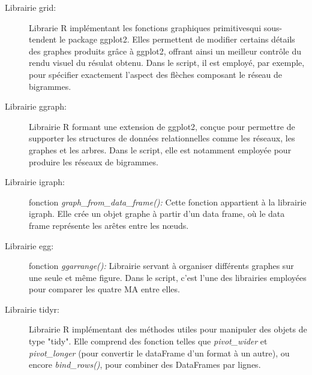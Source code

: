 \documentclass{book}
\begin{document}
\begin{description}
      \item[Librairie grid:] Librarie R implémentant les fonctions graphiques primitives\sloppy qui sous-tendent le package ggplot2. Elles permettent de modifier certains détails des graphes produits grâce à ggplot2, offrant ainsi un meilleur contrôle du rendu visuel du résulat obtenu. Dans le script, il est employé, par exemple, pour spécifier exactement l'aspect des flèches composant le réseau de bigrammes. 
      \item[Librairie ggraph:] Librairie R formant une extension de ggplot2, conçue pour permettre de supporter les structures de données relationnelles comme les réseaux, les graphes et les arbres. Dans le script, elle est notamment employée pour produire les réseaux de bigrammes.
      \item[Librairie igraph:] fonction \textit{graph\_from\_data\_frame():} Cette fonction appartient à la librairie igraph. Elle crée un objet graphe à partir d'un data frame, où le data frame représente les arêtes entre les nœuds.
      \item[Librairie egg:] fonction \textit{ggarrange():} Librairie servant à organiser différents graphes sur une seule et même figure. Dans le script, c'est l'une des librairies employées pour comparer les quatre MA entre elles.
      \item[Librairie tidyr:] Librairie R implémentant des méthodes utiles pour manipuler des objets de type "tidy". Elle comprend des fonction telles que \textit{pivot\_wider} et \textit{pivot\_longer} (pour convertir le dataFrame d'un format à un autre), ou encore \textit{bind\_rows()}, pour combiner des DataFrames par lignes.
  \end{description}
\end{document}
